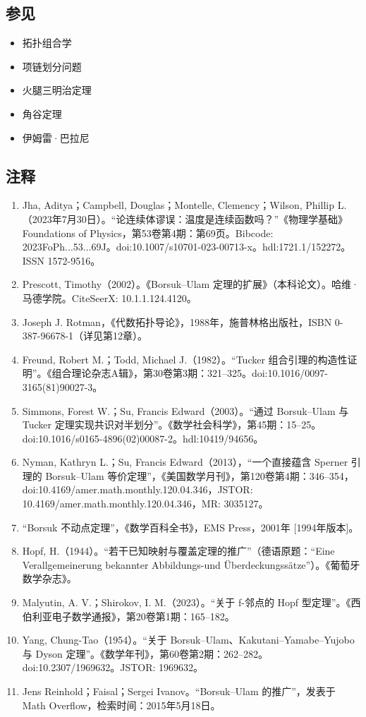 \subsection{参见}
\begin{itemize}
\item 拓扑组合学
\item 项链划分问题
\item 火腿三明治定理
\item 角谷定理
\item 伊姆雷·巴拉尼
\end{itemize}
\subsection{注释}
\begin{enumerate}
\item Jha, Aditya；Campbell, Douglas；Montelle, Clemency；Wilson, Phillip L.（2023年7月30日）。“论连续体谬误：温度是连续函数吗？”《物理学基础》Foundations of Physics，第53卷第4期：第69页。Bibcode: 2023FoPh...53...69J。doi:10.1007/s10701-023-00713-x。hdl:1721.1/152272。ISSN 1572-9516。
\item Prescott, Timothy（2002）。《Borsuk–Ulam 定理的扩展》（本科论文）。哈维·马德学院。CiteSeerX: 10.1.1.124.4120。
\item Joseph J. Rotman，《代数拓扑导论》，1988年，施普林格出版社，ISBN 0-387-96678-1（详见第12章）。
\item Freund, Robert M.；Todd, Michael J.（1982）。“Tucker 组合引理的构造性证明”。《组合理论杂志A辑》，第30卷第3期：321–325。doi:10.1016/0097-3165(81)90027-3。
\item Simmons, Forest W.；Su, Francis Edward（2003）。“通过 Borsuk–Ulam 与 Tucker 定理实现共识对半划分”。《数学社会科学》，第45期：15–25。doi:10.1016/s0165-4896(02)00087-2。hdl:10419/94656。
\item Nyman, Kathryn L.；Su, Francis Edward（2013），“一个直接蕴含 Sperner 引理的 Borsuk–Ulam 等价定理”，《美国数学月刊》，第120卷第4期：346–354，doi:10.4169/amer.math.monthly.120.04.346，JSTOR: 10.4169/amer.math.monthly.120.04.346，MR: 3035127。
\item “Borsuk 不动点定理”，《数学百科全书》，EMS Press，2001年 [1994年版本]。
\item Hopf, H.（1944）。“若干已知映射与覆盖定理的推广”（德语原题：“Eine Verallgemeinerung bekannter Abbildungs-und Überdeckungssätze”）。《葡萄牙数学杂志》。
\item Malyutin, A. V.；Shirokov, I. M.（2023）。“关于 f-邻点的 Hopf 型定理”。《西伯利亚电子数学通报》，第20卷第1期：165–182。
\item Yang, Chung-Tao（1954）。“关于 Borsuk–Ulam、Kakutani–Yamabe–Yujobo 与 Dyson 定理”。《数学年刊》，第60卷第2期：262–282。doi:10.2307/1969632。JSTOR: 1969632。
\item Jens Reinhold；Faisal；Sergei Ivanov。“Borsuk–Ulam 的推广”，发表于 Math Overflow，检索时间：2015年5月18日。
\end{enumerate}
